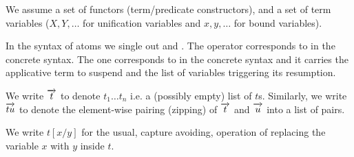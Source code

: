 \documentclass[a4paper, 11pt]{book}
\begin{document}
We assume a set \PRED of functors (term/predicate constructors), and a set \VAR of term variables
($X,Y,\ldots$ for unification variables and $x,y,\ldots$ for bound variables).

In the syntax of atoms \ATOM we single out \cut and \cst.
The \cut operator corresponds to \elpi{!} in the concrete syntax.
The \cst one corresponds to  in the concrete syntax
and it carries the applicative term to suspend and the list of variables triggering
its resumption.


We write \(\vecL{t}\) to denote \(t_1 \ldots t_n\) i.e. a (possibly
empty) list of \(t\)s.
Similarly, we write \(\vecL{tu}\) to denote the
element-wise pairing (zipping) of \(\vecL{t}\) and \(\vecL{u}\) into a list of
pairs. %

We write
$t[x/y]$ for the usual, capture avoiding, operation of replacing the variable $x$
with $y$ inside $t$.

\end{document}
